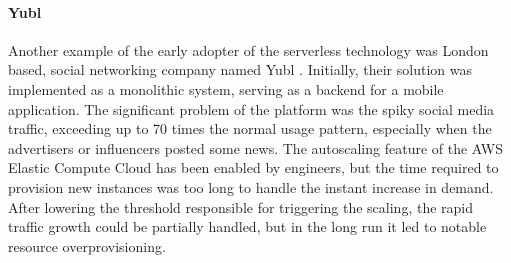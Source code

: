 

\paragraph*{Yubl} \label{chapter:serverless-suitability-yubl}

Another example of the early adopter of the serverless technology was London based, social networking company named Yubl \cite{ServerlessComputingEconomicAndArchitecturalImpact}.
Initially, their solution was implemented as a monolithic system, serving as a backend for a mobile application.
The significant problem of the platform was the spiky social media traffic, exceeding up to 70 times the normal usage pattern, especially when the advertisers or influencers posted some news.
The autoscaling feature of the AWS Elastic Compute Cloud has been enabled by engineers, but the time required to provision new instances was too long to handle the instant increase in demand.
After lowering the threshold responsible for triggering the scaling, the rapid traffic growth could be partially handled, but in the long run it led to notable resource overprovisioning.

